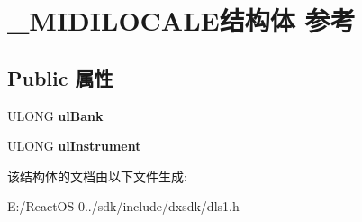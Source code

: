 \hypertarget{struct___m_i_d_i_l_o_c_a_l_e}{}\section{\+\_\+\+M\+I\+D\+I\+L\+O\+C\+A\+L\+E结构体 参考}
\label{struct___m_i_d_i_l_o_c_a_l_e}
\subsection*{Public 属性}
\begin{DoxyCompactItemize}
\item 
\mbox{\label{struct___m_i_d_i_l_o_c_a_l_e_ad1fddb3a6668914cf3fc94fb2717a7ea}} 
U\+L\+O\+NG {\bfseries ul\+Bank}
\item 
\mbox{\label{struct___m_i_d_i_l_o_c_a_l_e_ac8fe14d50acfd2ae250520b9fd525223}} 
U\+L\+O\+NG {\bfseries ul\+Instrument}
\end{DoxyCompactItemize}


该结构体的文档由以下文件生成\+:\begin{DoxyCompactItemize}
\item 
E\+:/\+React\+O\+S-\/0../sdk/include/dxsdk/dls1.\+h\end{DoxyCompactItemize}
